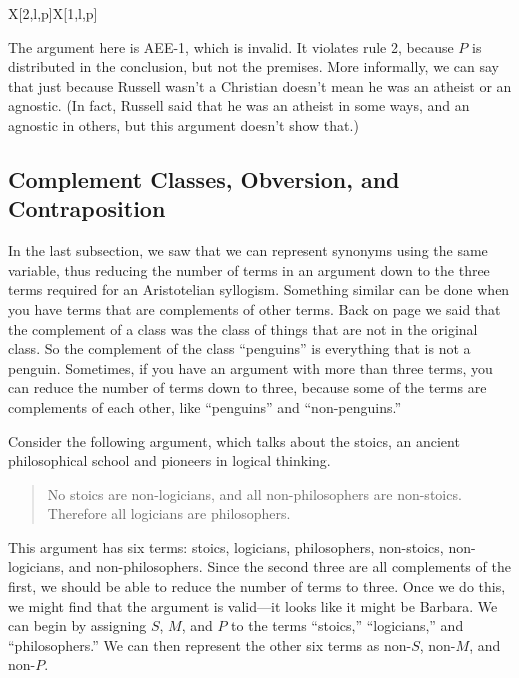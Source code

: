 {\begin{tabu}{{X[2,l,p]X[1,l,p]}}
\end{tabu}

The argument here is AEE-1, which is invalid. It violates rule 2, because $P$ is distributed in the conclusion, but not the premises. More informally, we can say that just because Russell wasn't a Christian doesn't mean he was an atheist or an agnostic. (In fact, Russell said that he was an atheist in some ways, and an agnostic in others, but this argument doesn't show that.) 


\subsection{Complement Classes, Obversion, and Contraposition}

In the last subsection, we saw that we can represent synonyms using the same variable, thus reducing the number of terms in an argument down to the three terms required for an Aristotelian syllogism. Something similar can be done when you have terms that are complements of other terms. Back on page \pageref{def:Complement} we said that the complement of a class was the class of things that are not in the original class. So the complement of the class ``penguins'' is everything that is not a penguin. Sometimes, if you have an argument with more than three terms, you can reduce the number of terms down to three, because some of the terms are complements of each other, like ``penguins'' and ``non-penguins.''

 Consider the following argument, which talks about the stoics, an ancient philosophical school and pioneers in logical thinking. 

\begin{quotation}
No stoics are non-logicians, and all non-philosophers are non-stoics. Therefore all logicians are philosophers.
\end{quotation}

This argument has six terms: stoics, logicians, philosophers, non-stoics, non-logicians, and non-philosophers. Since the second three are all complements of the first, we should be able to reduce the number of terms to three. Once we do this, we might find that the argument is valid---it looks like it might be Barbara. We can begin by assigning $S$, $M$, and $P$ to the terms ``stoics,'' ``logicians,'' and ``philosophers.'' We can then represent the other six terms as non-$S$, non-$M$, and non-$P$. 


}

